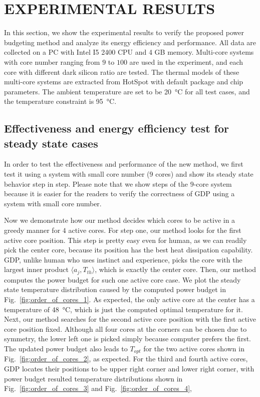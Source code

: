 \section{EXPERIMENTAL RESULTS}
In this section, we show the experimental results to verify the proposed power budgeting method and analyze its energy efficiency and performance. All data are collected on a PC with Intel I5 2400 CPU and 4 GB memory. Multi-core systems with core number ranging from $9$ to $100$ are used in the experiment, and each core with different dark silicon ratio are tested. The thermal models of these multi-core systems are extracted from HotSpot with default package and chip parameters. The ambient temperature are set to be \SI{20}{\degreeCelsius} for all test cases, and the temperature constraint is \SI{95}{\degreeCelsius}.

\subsection{Effectiveness and energy efficiency test for steady state cases}
In order to test the effectiveness and performance of the new method, we first test it
using a system with small core number ($9$ cores) and show its steady state
behavior step in step. Please note that we show steps of the $9$-core system
because it is easier for the readers to verify the correctness of GDP using
a system with small core number.

Now we demonstrate how our method decides which cores to be active in a
greedy manner for $4$ active cores. For step one, our method looks for the first
active core position. This step is pretty easy even for human, as we
can readily pick the center core, because its position has the best
heat dissipation capability. GDP, unlike human who uses instinct and
experience, picks the core with the largest inner product $\langle
a_j, T_{th}\rangle$, which is exactly the center core. 
Then, our method computes the power
budget for such one active core case. We plot the steady state temperature
distribution caused by the computed power budget in
Fig.~\ref{fig:order_of_cores_1}. As expected, the only active core at
the center has a temperature of \SI{48}{\degreeCelsius}, which is just
the computed optimal temperature for it. Next, our method searches for the
second active core position with the first active core position
fixed. Although all four cores at the corners can be chosen due to
symmetry, the lower left one is picked simply because computer prefers
the first. The updated power budget also leads to
$T_{opt}$ for the two active cores shown in Fig.~\ref{fig:order_of_cores_2}, as expected. For the
third and fourth active cores, GDP locates their positions to be 
upper right corner and lower right corner, with power budget
resulted temperature distributions shown in
Fig.~\ref{fig:order_of_cores_3} and Fig.~\ref{fig:order_of_cores_4},


